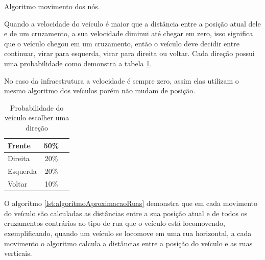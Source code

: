 \begin{algorithm}
	\scriptsize
	\caption{Algoritmo movimento dos nós.}
	\label{lst:algoritmoComportamentoNos}
\end{algorithm}	

Quando a velocidade do veículo é maior que a distância entre a posição atual dele e de um cruzamento, a sua velocidade diminui até chegar em zero, isso significa que o veículo chegou em um cruzamento, então o veículo deve decidir entre continuar, virar para esquerda, virar para direita ou voltar. Cada direção possui uma probabilidade como demonstra a tabela \ref{tab:probabilidadeEscolhaDirecao}.

No caso da infraestrutura a velocidade é sempre zero, assim elas utilizam o mesmo algoritmo dos veículos porém não mudam de posição.

\begin{table}[ht]
	\centering
	\begin{tabular}{ | l | c | r}
		\hline
		Frente & 50\%  \\ \hline
		Direita & 20\% 	\\ \hline
		Esquerda & 20\% \\ \hline
		Voltar & 10\%   \\ \hline 
	\end{tabular}
	\caption{Probabilidade do veículo escolher uma direção}
	\label{tab:probabilidadeEscolhaDirecao}
\end{table}

O algoritmo \ref{lst:algoritmoAproximacaoRuas} demonstra que em cada movimento do veículo são calculadas as distâncias entre a sua posição atual e de todos os cruzamentos contrários ao tipo de rua que o veículo está locomovendo, exemplificando, quando um veículo se locomove em uma rua horizontal, a cada movimento o algoritmo calcula a distâncias entre a posição do veículo e as ruas verticais.

